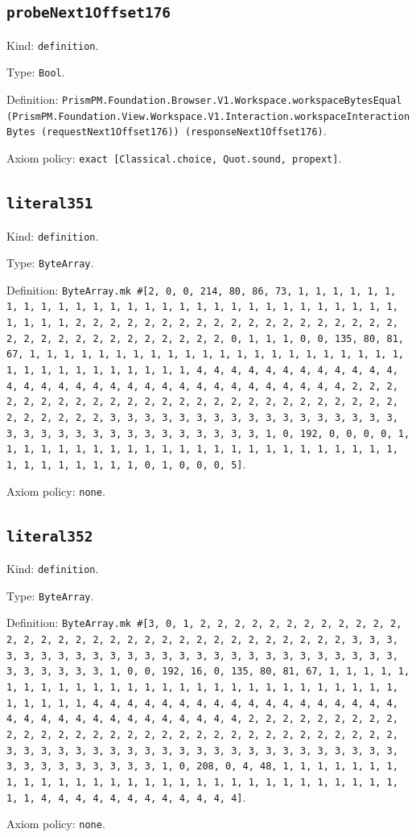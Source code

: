 \documentclass[11pt]{article}
\begin{document}
\subsection*{\texttt{probeNext1Offset176}}
\noindent Kind: \texttt{definition}.\par
\noindent Type: \texttt{Bool}.\par
\noindent Definition: \texttt{PrismPM.Foundation.Browser.V1.Workspace.workspaceBytesEqual (PrismPM.Foundation.View.Workspace.V1.Interaction.workspaceInteractionBytes (requestNext1Offset176)) (responseNext1Offset176)}.\par
\noindent Axiom policy: \texttt{exact [Classical.choice, Quot.sound, propext]}.\par
\subsection*{\texttt{literal351}}
\noindent Kind: \texttt{definition}.\par
\noindent Type: \texttt{ByteArray}.\par
\noindent Definition: \texttt{ByteArray.mk \#[2, 0, 0, 214, 80, 86, 73, 1, 1, 1, 1, 1, 1, 1, 1, 1, 1, 1, 1, 1, 1, 1, 1, 1, 1, 1, 1, 1, 1, 1, 1, 1, 1, 1, 1, 1, 1, 1, 1, 1, 2, 2, 2, 2, 2, 2, 2, 2, 2, 2, 2, 2, 2, 2, 2, 2, 2, 2, 2, 2, 2, 2, 2, 2, 2, 2, 2, 2, 2, 2, 2, 2, 0, 1, 1, 1, 0, 0, 135, 80, 81, 67, 1, 1, 1, 1, 1, 1, 1, 1, 1, 1, 1, 1, 1, 1, 1, 1, 1, 1, 1, 1, 1, 1, 1, 1, 1, 1, 1, 1, 1, 1, 1, 1, 1, 4, 4, 4, 4, 4, 4, 4, 4, 4, 4, 4, 4, 4, 4, 4, 4, 4, 4, 4, 4, 4, 4, 4, 4, 4, 4, 4, 4, 4, 4, 4, 4, 2, 2, 2, 2, 2, 2, 2, 2, 2, 2, 2, 2, 2, 2, 2, 2, 2, 2, 2, 2, 2, 2, 2, 2, 2, 2, 2, 2, 2, 2, 2, 2, 3, 3, 3, 3, 3, 3, 3, 3, 3, 3, 3, 3, 3, 3, 3, 3, 3, 3, 3, 3, 3, 3, 3, 3, 3, 3, 3, 3, 3, 3, 3, 3, 1, 0, 192, 0, 0, 0, 0, 1, 1, 1, 1, 1, 1, 1, 1, 1, 1, 1, 1, 1, 1, 1, 1, 1, 1, 1, 1, 1, 1, 1, 1, 1, 1, 1, 1, 1, 1, 1, 1, 0, 1, 0, 0, 0, 5]}.\par
\noindent Axiom policy: \texttt{none}.\par
\subsection*{\texttt{literal352}}
\noindent Kind: \texttt{definition}.\par
\noindent Type: \texttt{ByteArray}.\par
\noindent Definition: \texttt{ByteArray.mk \#[3, 0, 1, 2, 2, 2, 2, 2, 2, 2, 2, 2, 2, 2, 2, 2, 2, 2, 2, 2, 2, 2, 2, 2, 2, 2, 2, 2, 2, 2, 2, 2, 2, 2, 2, 3, 3, 3, 3, 3, 3, 3, 3, 3, 3, 3, 3, 3, 3, 3, 3, 3, 3, 3, 3, 3, 3, 3, 3, 3, 3, 3, 3, 3, 3, 3, 3, 1, 0, 0, 192, 16, 0, 135, 80, 81, 67, 1, 1, 1, 1, 1, 1, 1, 1, 1, 1, 1, 1, 1, 1, 1, 1, 1, 1, 1, 1, 1, 1, 1, 1, 1, 1, 1, 1, 1, 1, 1, 1, 1, 4, 4, 4, 4, 4, 4, 4, 4, 4, 4, 4, 4, 4, 4, 4, 4, 4, 4, 4, 4, 4, 4, 4, 4, 4, 4, 4, 4, 4, 4, 4, 4, 2, 2, 2, 2, 2, 2, 2, 2, 2, 2, 2, 2, 2, 2, 2, 2, 2, 2, 2, 2, 2, 2, 2, 2, 2, 2, 2, 2, 2, 2, 2, 2, 3, 3, 3, 3, 3, 3, 3, 3, 3, 3, 3, 3, 3, 3, 3, 3, 3, 3, 3, 3, 3, 3, 3, 3, 3, 3, 3, 3, 3, 3, 3, 3, 1, 0, 208, 0, 4, 48, 1, 1, 1, 1, 1, 1, 1, 1, 1, 1, 1, 1, 1, 1, 1, 1, 1, 1, 1, 1, 1, 1, 1, 1, 1, 1, 1, 1, 1, 1, 1, 1, 4, 4, 4, 4, 4, 4, 4, 4, 4, 4, 4, 4]}.\par
\noindent Axiom policy: \texttt{none}.\par
\end{document}
